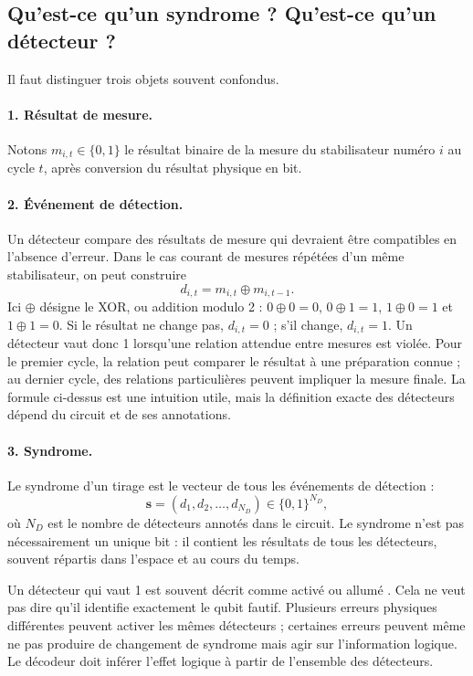 \documentclass[11pt,a4paper]{article}
\newcommand{\xor}{\oplus}
\begin{document}
\subsection{Qu'est-ce qu'un syndrome ? Qu'est-ce qu'un détecteur ?}

Il faut distinguer trois objets souvent confondus.

\paragraph{1. Résultat de mesure.}
Notons $m_{i,t}\in\{0,1\}$ le résultat binaire de la mesure du stabilisateur
numéro $i$ au cycle $t$, après conversion du résultat physique en bit.

\paragraph{2. Événement de détection.}
Un détecteur compare des résultats de mesure qui devraient être compatibles
en l'absence d'erreur. Dans le cas courant de mesures répétées d'un même
stabilisateur, on peut construire
\[
 d_{i,t}=m_{i,t}\xor m_{i,t-1}.
\]
Ici $\xor$ désigne le XOR, ou addition modulo 2 : $0\xor0=0$,
$0\xor1=1$, $1\xor0=1$ et $1\xor1=0$. Si le résultat ne change pas,
$d_{i,t}=0$ ; s'il change, $d_{i,t}=1$. Un détecteur vaut donc 1 lorsqu'une
relation attendue entre mesures est violée. Pour le premier cycle, la
relation peut comparer le résultat à une préparation connue ; au dernier
cycle, des relations particulières peuvent impliquer la mesure finale.
La formule ci-dessus est une intuition utile, mais la définition exacte des
détecteurs dépend du circuit et de ses annotations.

\paragraph{3. Syndrome.}
Le syndrome d'un tirage est le vecteur de tous les événements de détection :
\[
 \mathbf s=(d_1,d_2,\ldots,d_{N_D})\in\{0,1\}^{N_D},
\]
où $N_D$ est le nombre de détecteurs annotés dans le circuit. Le syndrome
n'est pas nécessairement un unique bit : il contient les résultats de tous
les détecteurs, souvent répartis dans l'espace et au cours du temps.

Un détecteur qui vaut 1 est souvent décrit comme \og activé \fg{} ou
\og allumé \fg{}. Cela ne veut pas dire qu'il identifie exactement le qubit
fautif. Plusieurs erreurs physiques différentes peuvent activer les mêmes
détecteurs ; certaines erreurs peuvent même ne pas produire de changement
de syndrome mais agir sur l'information logique. Le décodeur doit inférer
l'effet logique à partir de l'ensemble des détecteurs.
\end{document}
